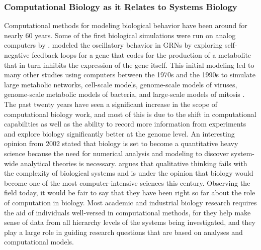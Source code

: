 \subsubsection{Computational Biology as it Relates to Systems Biology} \label{intro-compbio}
Computational methods for modeling biological behavior have been around for nearly 60 years. Some of the first biological simulations were run on analog computers by \citet{Goodwin1963}.  \citeauthor{Goodwin1963} modeled the oscillatory behavior in \acrshort{GRNs} by exploring self-negative feedback loops for a gene that codes for the production of a metabolite that in turn inhibits the expression of the gene itself. This initial modeling led to many other studies using computers between the 1970s and the 1990s to simulate large metabolic networks, cell-scale models, genome-scale models of viruses, genome-scale metabolic models of bacteria, and large-scale models of mitosis \citep{Palsson2006}. The past twenty years have seen a significant increase in the scope of computational biology work, and most of this is due to the shift in computational capabilities as well as the ability to record more information from experiments and explore biology significantly better at the genome level. An interesting opinion from 2002 stated that biology is set to become a quantitative heavy science because the need for numerical analysis and modeling to discover system-wide analytical theories is necessary.  \citet{Noble2002} argues that qualitative thinking fails with the complexity of biological systems and is under the opinion that biology would become one of the most computer-intensive sciences this century. Observing the field today, it would be fair to say that they have been right so far about the role of computation in biology. Most academic and industrial biology research requires the aid of individuals well-versed in computational methods, for they help make sense of data from all hierarchy levels of the systems being investigated, and they play a large role in guiding research questions that are based on analyses and computational models.   


